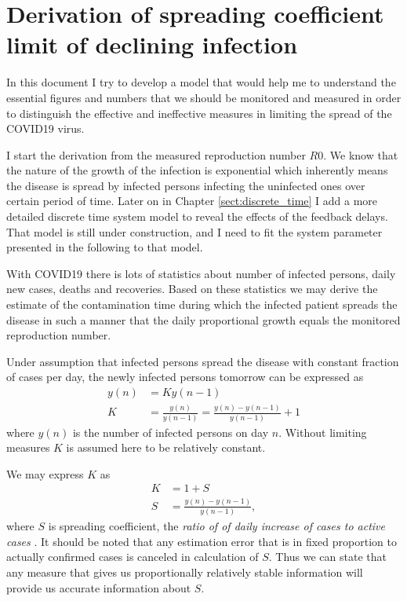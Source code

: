 \chapter{Derivation of spreading coefficient limit of declining infection}\label{chap:principles}

In this document I try to develop a model that would help me to understand the
essential figures and numbers that we should be monitored and measured in order to 
distinguish the effective and ineffective measures in limiting the spread of
the COVID19 virus.

I start the derivation from the measured reproduction number $R0$. We know that
the nature of the growth of the infection is exponential which inherently
means the disease is spread by infected persons infecting the uninfected ones
over certain period of time. Later on in Chapter \ref{sect:discrete_time} I add a more detailed discrete time
system model to reveal the effects of the feedback delays. That model is still
under construction, and I need to fit the system parameter presented in the
following to that model.

With COVID19 there is lots of statistics about number of
infected persons, daily new cases, deaths and recoveries. Based on these
statistics we may derive the estimate of the contamination time during which
the infected patient spreads the disease in such a manner that the daily
proportional growth equals the monitored reproduction number.

Under assumption that infected persons spread the disease with constant
fraction of cases per day, the newly infected persons tomorrow can be
expressed as
\begin{align}
    y\left(n\right)&=K y\left(n-1\right)\\
    K&= \frac{y\left(n\right)}{y\left(n-1\right)}=
    \frac{y\left(n\right)-y\left(n-1\right)}{y\left(n-1\right)}+1
\end{align}
where $y\left(n\right)$ is the number of infected persons on day $n$. Without
limiting measures $K$ is assumed here to be relatively constant. 

We may express $K$ as
\begin{align}
    K&= 1+S\\
    S &= \frac{y\left(n\right)-y\left(n-1\right)}{y\left(n-1\right)},
\end{align}
where $S$ is spreading coefficient, the \emph{ ratio of of daily increase of
    cases  to
active cases }. It should be noted that any estimation error that is in fixed
proportion to actually confirmed cases is canceled in calculation of $S$. Thus
we can state that any measure that gives us proportionally relatively stable
information will provide us accurate information about $S$.

